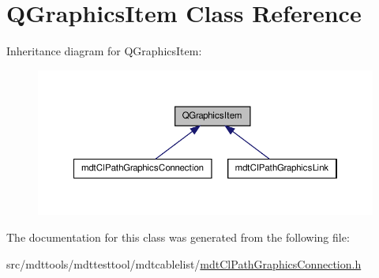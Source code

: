 \hypertarget{class_q_graphics_item}{\section{Q\-Graphics\-Item Class Reference}
\label{class_q_graphics_item}
}


Inheritance diagram for Q\-Graphics\-Item\-:
\nopagebreak
\begin{figure}[H]
\begin{center}
\leavevmode
\includegraphics[width=350pt]{class_q_graphics_item__inherit__graph}
\end{center}
\end{figure}


The documentation for this class was generated from the following file\-:\begin{DoxyCompactItemize}
\item 
src/mdttools/mdttesttool/mdtcablelist/\hyperlink{mdt_cl_path_graphics_connection_8h}{mdt\-Cl\-Path\-Graphics\-Connection.\-h}\end{DoxyCompactItemize}
